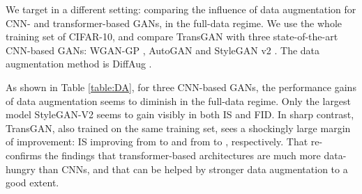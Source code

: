 \documentclass{article}
\begin{document}
We target in a different setting: comparing the influence of data augmentation for CNN- and transformer-based GANs, in the full-data regime. We use the whole training set of CIFAR-10, and compare TransGAN with three state-of-the-art CNN-based GANs: WGAN-GP \cite{gulrajani2017improved}, AutoGAN and StyleGAN v2 \cite{karras2020analyzing}. The data augmentation method is DiffAug \cite{zhao2020differentiable}.










\begin{table}[h]
\vspace{-0.5em}
\caption{The effectiveness of Data Augmentation (DA) on both CNN-based GANs and TransGAN. We used the full CIFAR-10 training set and DiffAug \cite{zhao2020differentiable}. }
\label{table:DA}
\vskip 0.05in
\begin{center}
\begin{small}
\begin{sc}
\end{sc}
\end{small}
\end{center}
\vspace{-0.5em}
\end{table}

As shown in Table \ref{table:DA}, for three CNN-based GANs, the performance gains of data augmentation seems to diminish in the full-data regime.  Only the largest model StyleGAN-V2 seems to gain visibly in both IS and FID. In sharp contrast, TransGAN, also trained on the same training set, sees a shockingly large margin of improvement: IS improving from  to  and from  to , respectively. That re-confirms the findings \cite{dosovitskiy2020image,touvron2020training} that transformer-based architectures are much more data-hungry than CNNs, and that can be helped by stronger data augmentation to a good extent.
\end{document}
